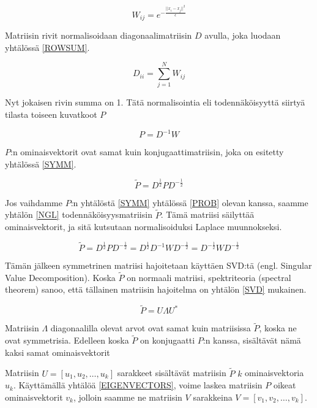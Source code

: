 \begin{equation}
W_{ij} = e^{-\frac{||x_i - x_j||^2}{\epsilon}}
\label{KERNEL}
\end{equation}

Matriisin rivit normalisoidaan diagonaalimatriisin $D$ avulla, joka luodaan yhtälössä \ref{ROWSUM}. 

\begin{equation}
D_{ii} = \sum_{j=1}^{N} W_{ij}
\label{ROWSUM}
\end{equation}

Nyt jokaisen rivin summa on 1. Tätä normalisointia eli todennäköisyyttä siirtyä tilasta toiseen kuvatkoot $P$

\begin{equation}
P = D^{-1} W
\label{PROB}
\end{equation}

$P$:n ominaisvektorit ovat samat kuin konjugaattimatriisin, joka on esitetty yhtälössä \ref{SYMM}. 

\begin{equation}
\tilde{P} = D^{\frac{1}{2}} P D^{-\frac{1}{2}}
\label{SYMM}
\end{equation}

Jos vaihdamme $P$:n yhtälöstä \ref{SYMM} yhtälössä \ref{PROB} olevan kanssa, saamme yhtälön \ref{NGL} todennäköisyysmatriisin $\tilde{P}$. Tämä matriisi säilyttää ominaisvektorit, ja sitä kutsutaan
normalisoiduksi Laplace muunnokseksi.

\begin{equation}
\tilde{P} = D^{\frac{1}{2}} P D^{-\frac{1}{2}} = D^{\frac{1}{2}} D^{-1} W D^{-\frac{1}{2}} = D^{-\frac{1}{2}} W D^{-\frac{1}{2}}
\label{NGL}
\end{equation}

Tämän jälkeen symmetrinen matriisi hajoitetaan käyttäen SVD:tä (engl. Singular Value Decomposition). Koska $\tilde{P}$ on normaali matriisi, spektriteoria (spectral theorem) sanoo, että tällainen matriisin 
hajoitelma on yhtälön \ref{SVD} mukainen.  

\begin{equation}
\tilde{P} = U \Lambda U^*
\label{SVD}
\end{equation}

Matriisin $\Lambda$ diagonaalilla olevat arvot ovat samat kuin matriisissa $\tilde{P}$, koska ne ovat symmetrisia. Edelleen koska $\tilde{P}$ on konjugaatti $P$:n kanssa, sisältävät nämä kaksi samat ominaisvektorit 

Matriisin $U = [ u_1, u_2, \dots, u_k ]$ sarakkeet sisältävät matriisin $\tilde{P}$ $k$ ominaisvektoria $u_k$. Käyttämällä yhtälöä \ref{EIGENVECTORS}, voime laskea matriisin $P$ oikeat ominaisvektorit $v_k$, jolloin 
saamme ne matriisin $V$ sarakkeina  $V = [v_1, v_2, \dots, v_k]$.  

